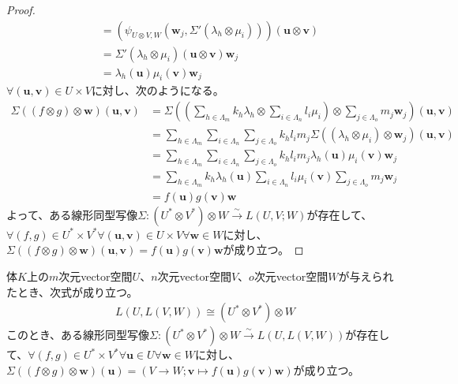 \documentclass[dvipdfmx]{jsarticle}
\begin{document}
\begin{proof}
\begin{align*}
&= \left( \psi_{U \otimes V,W}\left( \mathbf{w}_{j},\varSigma'\left( \lambda_{h} \otimes \mu_{i} \right) \right) \right)\left( \mathbf{u} \otimes \mathbf{v} \right)\\
&= \varSigma'\left( \lambda_{h} \otimes \mu_{i} \right)\left( \mathbf{u} \otimes \mathbf{v} \right)\mathbf{w}_{j}\\
&= \lambda_{h}\left( \mathbf{u} \right)\mu_{i}\left( \mathbf{v} \right)\mathbf{w}_{j}
\end{align*}
$\forall\left( \mathbf{u},\mathbf{v} \right) \in U \times V$に対し、次のようになる。
\begin{align*}
\varSigma\left( (f \otimes g) \otimes \mathbf{w} \right)\left( \mathbf{u},\mathbf{v} \right) &= \varSigma\left( \left( \sum_{h \in \varLambda_{m}} {k_{h}\lambda_{h}} \otimes \sum_{i \in \varLambda_{n}} {l_{i}\mu_{i}} \right) \otimes \sum_{j \in \varLambda_{o}} {m_{j}\mathbf{w}_{j}} \right)\left( \mathbf{u},\mathbf{v} \right)\\
&= \sum_{h \in \varLambda_{m}} {\sum_{i \in \varLambda_{n}} {\sum_{j \in \varLambda_{o}} {k_{h}l_{i}m_{j}\varSigma\left( \left( \lambda_{h} \otimes \mu_{i} \right) \otimes \mathbf{w}_{j} \right)\left( \mathbf{u},\mathbf{v} \right)}}}\\
&= \sum_{h \in \varLambda_{m}} {\sum_{i \in \varLambda_{n}} {\sum_{j \in \varLambda_{o}} {k_{h}l_{i}m_{j}\lambda_{h}\left( \mathbf{u} \right)\mu_{i}\left( \mathbf{v} \right)\mathbf{w}_{j}}}}\\
&= \sum_{h \in \varLambda_{m}} {k_{h}\lambda_{h}\left( \mathbf{u} \right)}\sum_{i \in \varLambda_{n}} {l_{i}\mu_{i}\left( \mathbf{v} \right)}\sum_{j \in \varLambda_{o}} {m_{j}\mathbf{w}_{j}}\\
&= f\left( \mathbf{u} \right)g\left( \mathbf{v} \right)\mathbf{w}
\end{align*}
よって、ある線形同型写像$\varSigma:\left( U^{*} \otimes V^{*} \right) \otimes W\overset{\sim}{\rightarrow}L(U,V;W)$が存在して、$\forall(f,g) \in U^{*} \times V^{*}\forall\left( \mathbf{u},\mathbf{v} \right) \in U \times V\forall\mathbf{w} \in W$に対し、$\varSigma\left( (f \otimes g) \otimes \mathbf{w} \right)\left( \mathbf{u},\mathbf{v} \right) = f\left( \mathbf{u} \right)g\left( \mathbf{v} \right)\mathbf{w}$が成り立つ。
\end{proof}
\begin{thm}\label{2.4.5.20}
体$K$上の$m$次元vector空間$U$、$n$次元vector空間$V$、$o$次元vector空間$W$が与えられたとき、次式が成り立つ。
\begin{align*}
L\left( U,L(V,W) \right) \cong \left( U^{*} \otimes V^{*} \right) \otimes W
\end{align*}
このとき、ある線形同型写像$\varSigma:\left( U^{*} \otimes V^{*} \right) \otimes W\overset{\sim}{\rightarrow}L\left( U,L(V,W) \right)$が存在して、$\forall(f,g) \in U^{*} \times V^{*}\forall\mathbf{u} \in U\forall\mathbf{w} \in W$に対し、$\varSigma\left( (f \otimes g) \otimes \mathbf{w} \right)\left( \mathbf{u} \right) = \left( V \rightarrow W;\mathbf{v} \mapsto f\left( \mathbf{u} \right)g\left( \mathbf{v} \right)\mathbf{w} \right)$が成り立つ。
\end{thm}
\end{document}
